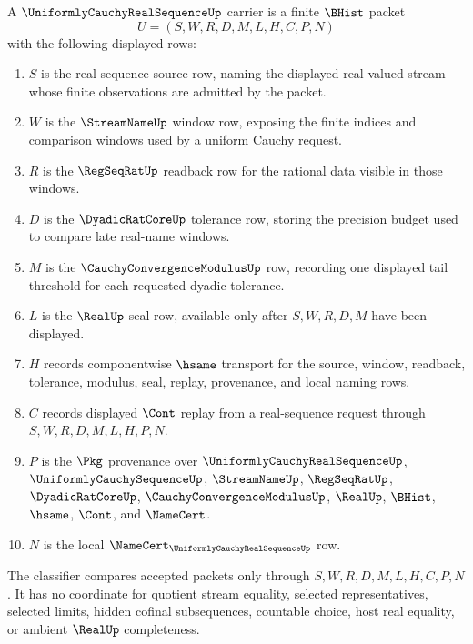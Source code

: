 \begin{definition}
\label{def:uniformly-cauchy-real-sequence-carrier}
A $\UniformlyCauchyRealSequenceUp$ carrier is a finite $\BHist$ packet
$$
U=(S,W,R,D,M,L,H,C,P,N)
$$
with the following displayed rows:
\begin{enumerate}
\item $S$ is the real sequence source row, naming the displayed real-valued stream whose finite observations are admitted by the packet.
\item $W$ is the $\StreamNameUp$ window row, exposing the finite indices and comparison windows used by a uniform Cauchy request.
\item $R$ is the $\RegSeqRatUp$ readback row for the rational data visible in those windows.
\item $D$ is the $\DyadicRatCoreUp$ tolerance row, storing the precision budget used to compare late real-name windows.
\item $M$ is the $\CauchyConvergenceModulusUp$ row, recording one displayed tail threshold for each requested dyadic tolerance.
\item $L$ is the $\RealUp$ seal row, available only after $S,W,R,D,M$ have been displayed.
\item $H$ records componentwise $\hsame$ transport for the source, window, readback, tolerance, modulus, seal, replay, provenance, and local naming rows.
\item $C$ records displayed $\Cont$ replay from a real-sequence request through $S,W,R,D,M,L,H,P,N$.
\item $P$ is the $\Pkg$ provenance over $\UniformlyCauchyRealSequenceUp$, $\UniformlyCauchySequenceUp$, $\StreamNameUp$, $\RegSeqRatUp$, $\DyadicRatCoreUp$, $\CauchyConvergenceModulusUp$, $\RealUp$, $\BHist$, $\hsame$, $\Cont$, and $\NameCert$.
\item $N$ is the local $\NameCert_{\UniformlyCauchyRealSequenceUp}$ row.
\end{enumerate}
The classifier compares accepted packets only through $S,W,R,D,M,L,H,C,P,N$. It has no coordinate for quotient stream equality, selected representatives, selected limits, hidden cofinal subsequences, countable choice, host real equality, or ambient $\RealUp$ completeness.
\end{definition}

